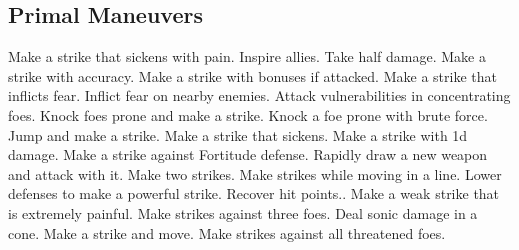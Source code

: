 \subsection{Primal Maneuvers}\label{Primal Maneuvers}
\begin{spelllist}
 Make a strike that sickens with pain.
 Inspire allies.
 Take half damage.
 Make a strike with  accuracy.
 Make a strike with bonuses if attacked.
 Make a strike that inflicts fear.
 Inflict fear on nearby enemies.
 Attack vulnerabilities in concentrating foes.
 Knock foes prone and make a strike.
 Knock a foe prone with brute force.
 Jump and make a strike.
 Make a strike that sickens.
 Make a strike with \plus1d damage.
 Make a strike against Fortitude defense.
 Rapidly draw a new weapon and attack with it.
 Make two strikes.
 Make strikes while moving in a line.
 Lower defenses to make a powerful strike.
 Recover hit points..
 Make a weak strike that is extremely painful.
 Make strikes against three foes.
 Deal sonic damage in a cone.
 Make a strike and move.
 Make strikes against all threatened foes.
\end{spelllist}



\small
